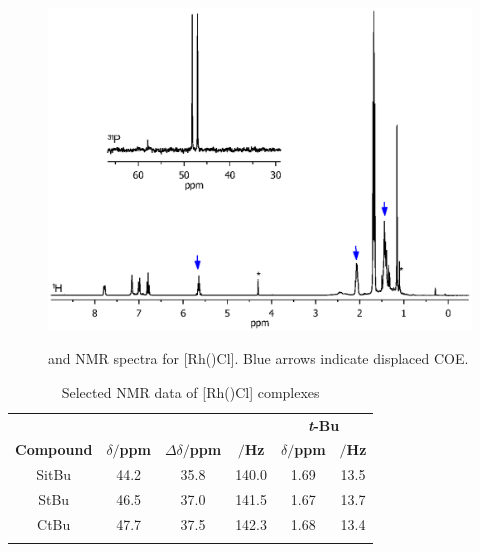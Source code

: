 \begin{figure}[htbp]
\begin{center}
\vspace{0.5cm}
\includegraphics[trim = 2.5cm 4.0cm 2.5cm 15cm, clip]{../NMR/7004B.eps}
\caption[\phosphorus{} and \proton{} NMR spectra for [Rh(\tBuxantphos)Cl{]}]{\phosphorus{} and \proton{} NMR spectra for [Rh(\tBuxantphos)Cl].  Blue arrows indicate displaced COE.}
\vspace{0.2cm}
\label{RhClnmr}
\end{center}
\end{figure}
\vspace{0.2cm}

\begin{table}[htbp]
\caption[Selected NMR data of [Rh(\tBuxantphos)Cl{]} complexes]{Selected NMR data of [Rh(\tBuxantphos)Cl] complexes}
\vspace{1em}
\label{table:rhodiumchloride}
\small
\begin{center}
\begin{tabular}{ c c c c c c}
	\toprule{}
	~ & \multicolumn{3}{c}{\bfseries{\phosphorus}} & \multicolumn{2}{c}{\bfseries{\proton{} \emph{t}-Bu}}\\
	\cmidrule(lr){2-4} \cmidrule(lr){5-6} 
	\bfseries{Compound}&\bfseries{$\delta/$ppm}&\bfseries{$\Delta\delta/$ppm}&\bfseries{\JRhP{}$/$Hz}&\bfseries{$\delta/$ppm}&\bfseries{\J $/$Hz}\\
	\midrule{}
	SitBu	&	44.2	&	35.8	&	140.0	& 1.69	& 13.5\\
	StBu		& 	46.5	&	37.0	&	141.5	& 1.67	& 13.7\\
	CtBu		&	47.7	&	37.5	&	142.3	& 1.68	& 13.4\\
	\bottomrule{}
\end{tabular}
\end{center}
\end{table}

